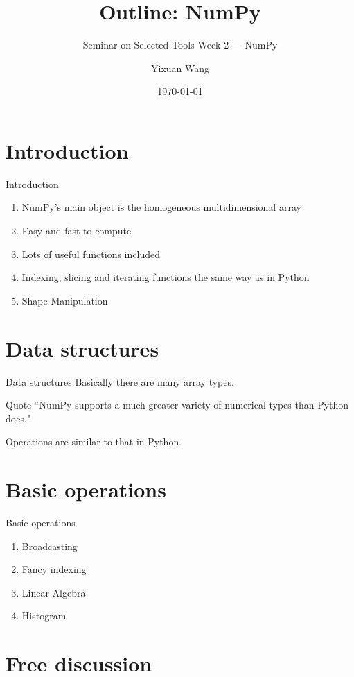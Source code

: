 \documentclass[english, nochinese]{../TeXTemplate/pkuslide}
\title{Outline: NumPy}
\subtitle{Seminar on Selected Tools Week 2 --- NumPy}
\author{Yixuan Wang}
\date{\today}
\begin{document}
\begin{frame}
\titlepage
\end{frame}

\begin{frame}
\tableofcontents[subsectionstyle=hide]
\end{frame}

\section{Introduction}

\begin{frame}
\sectionpage
\end{frame}



\begin{frame}{Introduction}
\begin{enumerate}
\item NumPy’s main object is the homogeneous multidimensional array
\item Easy and fast to compute
\item Lots of useful functions included 
\item Indexing, slicing and iterating functions the same way as in Python 
\item Shape Manipulation 
\end{enumerate}
\end{frame}

\section{Data structures}

\begin{frame}
\sectionpage
\end{frame}

\begin{frame}{Data structures}
Basically there are many array types. 

Quote ``NumPy supports a much greater variety of numerical types than Python does."

Operations are similar to that in Python.
\end{frame}


\section{Basic operations}

\begin{frame}
\sectionpage
\end{frame}

\begin{frame}{Basic operations}
\begin{enumerate}
\item Broadcasting
\item Fancy indexing
\item Linear Algebra 
\item Histogram
\end{enumerate}
\end{frame}

\section{Free discussion}

\begin{frame}
\sectionpage
\end{frame}
\end{document}
